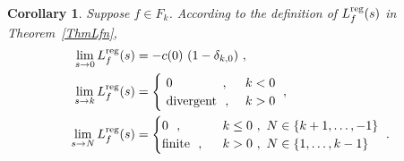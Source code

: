 \documentclass[11pt,a4paper]{article}
\newtheorem{cor}[thm]{Corollary}
\newcommand{\reg}{{\rm reg}}
\begin{document}
\begin{cor}\label{CorLfn2}
Suppose $f \in F_k$. According to the definition of $L_f^\reg(s)$ in Theorem~\ref{ThmLfn},
\begin{align}
\lim_{s \to 0} L_f^\reg(s) &= -c(0)~ (1-\delta_{k,0})~,~\label{s=0a} \\
\lim_{s \to k} L_f^\reg(s) &= 
\begin{cases}
~0\qquad \qquad,~&k < 0 \\ 
~{\rm divergent}~~ ,~ &k > 0 
\end{cases}
~,~\label{s=ka} \\
\lim_{s \to N} L_f^\reg(s) &= 
\begin{cases} 
0~~,\qquad ~&k \leq 0~,~N \in \{ k+1, \ldots, -1\} \\ 
{\rm finite}~~,~ ~  &k > 0~,~N \in \{ 1, \ldots, k-1\} ~~\end{cases} ~.~\label{s=Na}
\end{align}
\end{cor}
\end{document}
